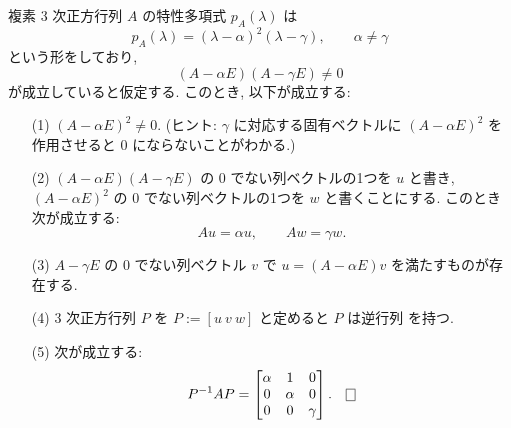 \documentclass[12pt,twoside]{jarticle}
\begin{document}
\begin{question}\label{q:normal-form-3.2}
  複素 $3$ 次正方行列 $A$ の特性多項式 $p_A(\lambda)$ は
  \begin{equation*}
    p_A(\lambda) = (\lambda - \alpha)^2 (\lambda - \gamma),
    \qquad \alpha \ne \gamma
  \end{equation*}
  という形をしており,
  \begin{equation*}
    (A - \alpha E)(A - \gamma E)\ne 0
  \end{equation*}
  が成立していると仮定する.  このとき, 以下が成立する:
  \begin{enumerate}
  \item[(1)] $(A - \alpha E)^2 \ne 0$.
    (ヒント: $\gamma$ に対応する固有ベクトルに $(A - \alpha E)^2$ 
    を作用させると $0$ にならないことがわかる.)
  \item[(2)] 
    $(A - \alpha E)(A - \gamma E)$ の $0$ でない列ベクトルの1つを $u$ と書き,
    $(A - \alpha E)^2$ の $0$ でない列ベクトルの1つを $w$ と書くことにする. 
    このとき次が成立する:
    \begin{equation*}
      Au = \alpha u,  \qquad Aw = \gamma w.
    \end{equation*}
  \item[(3)] $A - \gamma E$ の $0$ でない列ベクトル $v$ 
    で $u = (A - \alpha E)v$ を満たすものが存在する.
  \item[(4)] $3$ 次正方行列 $P$ を $P := [u\ v\ w]$ と定めると $P$ は逆行列
    を持つ. 
  \item[(5)] 次が成立する:
    \begin{equation*}
      P^{-1} A P 
      = 
      \begin{bmatrix}
        \alpha & 1 & 0 \\
        0 & \alpha & 0 \\
        0 & 0 & \gamma \\
      \end{bmatrix}.
      \qed
    \end{equation*}
  \end{enumerate}
\end{question}

\end{document}
